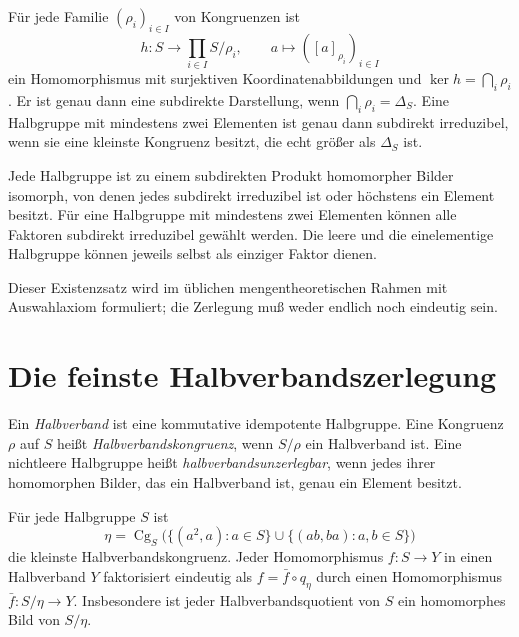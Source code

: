 \begin{theorem}
Für jede Familie $(\rho_i)_{i\in I}$ von Kongruenzen ist
\[
 h:S\to\prod_{i\in I}S/\rho_i,\qquad
 a\mapsto([a]_{\rho_i})_{i\in I}
\]
ein Homomorphismus mit surjektiven Koordinatenabbildungen und
$\ker h=\bigcap_i\rho_i$.
Er ist genau dann eine subdirekte Darstellung, wenn
$\bigcap_i\rho_i=\Delta_S$.
Eine Halbgruppe mit mindestens zwei Elementen ist genau dann
subdirekt irreduzibel, wenn sie eine kleinste Kongruenz besitzt,
die echt größer als $\Delta_S$ ist.
\cite{burris,howie}
\end{theorem}

\begin{theorem}
\label{b28guide:thm:subdirect}
Jede Halbgruppe ist zu einem subdirekten Produkt homomorpher Bilder
isomorph, von denen jedes subdirekt irreduzibel ist oder höchstens
ein Element besitzt. Für eine Halbgruppe mit mindestens zwei
Elementen können alle Faktoren subdirekt irreduzibel gewählt werden.
Die leere und die einelementige Halbgruppe können jeweils selbst
als einziger Faktor dienen.

Dieser Existenzsatz wird im üblichen mengentheoretischen Rahmen
mit Auswahlaxiom formuliert; die Zerlegung muß weder endlich noch
eindeutig sein.
\cite{burris}
\end{theorem}

\clearpage
\section{Die feinste Halbverbandszerlegung}

\begin{definition}
Ein \emph{Halbverband} ist eine kommutative idempotente Halbgruppe.
Eine Kongruenz $\rho$ auf $S$ heißt \emph{Halbverbandskongruenz},
wenn $S/\rho$ ein Halbverband ist.
Eine nichtleere Halbgruppe heißt \emph{halbverbandsunzerlegbar},
wenn jedes ihrer homomorphen Bilder, das ein Halbverband ist,
genau ein Element besitzt.
\end{definition}

\begin{theorem}
\label{b28guide:thm:semilattice-quotient}
Für jede Halbgruppe $S$ ist
\[
 \eta=\operatorname{Cg}_S\bigl(
 \{(a^2,a):a\in S\}\cup
 \{(ab,ba):a,b\in S\}\bigr)
\]
die kleinste Halbverbandskongruenz.
Jeder Homomorphismus $f:S\to Y$ in einen Halbverband $Y$
faktorisiert eindeutig als $f=\bar f\circ q_\eta$ durch
einen Homomorphismus $\bar f:S/\eta\to Y$.
Insbesondere ist jeder Halbverbandsquotient von $S$
ein homomorphes Bild von $S/\eta$.
\cite{bogdanovic2011}
\end{theorem}

